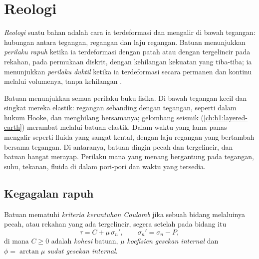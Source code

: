 \section{Reologi}\label{sec:b1:stress-strain-rheology:rheology}

\begin{definition}\label{def:b1:stress-strain-rheology:rheology}
\emph{Reologi} suatu bahan adalah cara ia terdeformasi dan mengalir di bawah tegangan: hubungan antara tegangan, regangan dan laju regangan. Batuan menunjukkan \emph{perilaku rapuh} ketika ia terdeformasi dengan patah atau dengan tergelincir pada rekahan, pada permukaan diskrit, dengan kehilangan kekuatan yang tiba-tiba; ia menunjukkan \emph{perilaku duktil} ketika ia terdeformasi secara permanen dan kontinu melalui volumenya, tanpa kehilangan .
\end{definition}

Batuan menunjukkan semua perilaku buku fisika. Di bawah tegangan kecil dan singkat mereka elastik: regangan sebanding dengan tegangan, seperti dalam hukum Hooke, dan menghilang bersamanya; gelombang seismik (\cref{ch:b1:layered-earth}) merambat melalui batuan elastik. Dalam waktu yang lama  panas mengalir seperti fluida yang sangat kental, dengan laju regangan yang bertambah bersama tegangan. Di antaranya, batuan dingin pecah dan tergelincir, dan batuan hangat merayap. Perilaku mana yang menang bergantung pada tegangan, suhu, tekanan, fluida di dalam pori-pori dan waktu yang tersedia.

\subsection*{Kegagalan rapuh}

\begin{definition}\label{def:b1:stress-strain-rheology:coulomb}
Batuan mematuhi \emph{kriteria keruntuhan Coulomb} jika sebuah bidang melaluinya pecah, atau rekahan yang ada tergelincir, segera setelah pada bidang itu
\[
  \tau = C + \mu\,\sigma_n' , \qquad \sigma_n' = \sigma_n - P ,
\]
di mana $C \ge 0$ adalah \emph{kohesi} batuan, $\mu$ \emph{koefisien gesekan internal} dan $\phi = \arctan\mu$ \emph{sudut gesekan internal}.
\end{definition}

